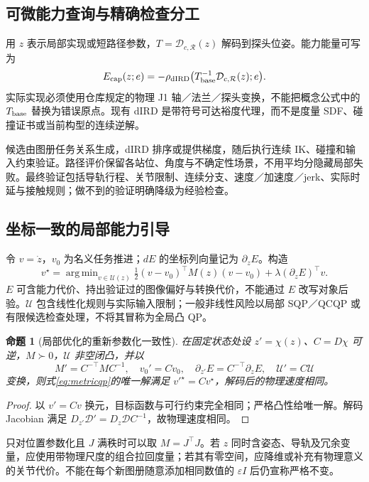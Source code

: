 \documentclass[UTF8,fontset=fandol,11pt,a4paper]{ctexart}
\theoremstyle{plain}
\newtheorem{proposition}[theorem]{命题}
\theoremstyle{definition}
\theoremstyle{remark}
\numberwithin{equation}{section}
\newcommand{\D}{\mathcal D}
\newcommand{\cR}{\mathcal R}
\newcommand{\cU}{\mathcal U}
\DeclareMathOperator*{\argmin}{arg\,min}
\begin{document}
\subsection{可微能力查询与精确检查分工}
用 $z$ 表示局部实现或短路径参数，$T=\D_{c,\cR}(z)$ 解码到探头位姿。能力能量可写为
\begin{equation}
 E_{\rm cap}(z;e)=-\rho_{\rm dIRD}\big(T_{\rm base}^{-1}\D_{c,\cR}(z);e\big).
 \label{eq:cap}
\end{equation}
实际实现必须使用仓库规定的物理 J1 轴／法兰／探头变换，不能把概念公式中的 $T_{\rm base}$ 替换为错误原点。现有 dIRD 是带符号可达裕度代理，而不是度量 SDF、碰撞证书或当前构型的连续逆解\cite{codeird}。

候选由图册任务关系生成，dIRD 排序或提供梯度，随后执行连续 IK、碰撞和输入约束验证。路径评价保留各站位、角度与不确定性场景，不用平均分隐藏局部失败。最终验证包括导轨行程、关节限制、连续分支、速度／加速度／jerk、实际时延与接触规则；做不到的验证明确降级为经验检查。

\subsection{坐标一致的局部能力引导}
令 $v=\dot z$，$v_0$ 为名义任务推进；$dE$ 的坐标列向量记为 $\partial_zE$。构造
\begin{equation}
 v^\star=\argmin_{v\in\cU(z)}
 \tfrac12(v-v_0)^\top M(z)(v-v_0)+\lambda(\partial_zE)^\top v.
 \label{eq:metricqp}
\end{equation}
$E$ 可含能力代价、持出验证过的图像偏好与转换代价，不能通过 $E$ 改写对象后验。$\cU$ 包含线性化规则与实际输入限制；一般非线性风险以局部 SQP／QCQP 或有限候选检查处理，不将其冒称为全局凸 QP。

\begin{proposition}[局部优化的重新参数化一致性]
\label{prop:metric}
在固定状态处设 $z'=\chi(z)$、$C=D\chi$ 可逆，$M\succ0$，$\cU$ 非空闭凸，并以
\begin{equation}
 M'=C^{-\top}MC^{-1},\quad v_0'=Cv_0,\quad
 \partial_{z'}E=C^{-\top}\partial_zE,\quad\cU'=C\cU
 \label{eq:coord}
\end{equation}
变换，则式\eqref{eq:metricqp}的唯一解满足 $v'^\star=Cv^\star$，解码后的物理速度相同。
\end{proposition}
\begin{proof}
以 $v'=Cv$ 换元，目标函数与可行约束完全相同；严格凸性给唯一解。解码 Jacobian 满足 $D_{z'}\D'=D_z\D C^{-1}$，故物理速度相同。
\end{proof}

只对位置参数化且 $J$ 满秩时可以取 $M=J^\top J$。若 $z$ 同时含姿态、导轨及冗余变量，应使用带物理尺度的组合拉回度量；若其有零空间，应降维或补充有物理意义的关节代价。不能在每个新图册随意添加相同数值的 $\varepsilon I$ 后仍宣称严格不变。
\end{document}
